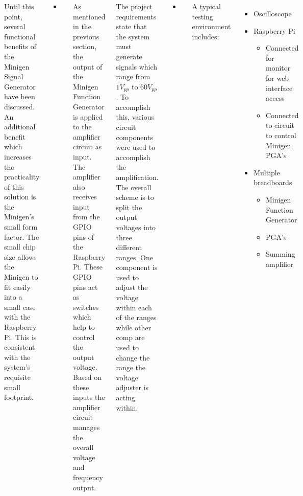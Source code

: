 \documentclass[25pt, a0paper, portrait, margin=0mm, innermargin=15mm, blockverticalspace=15mm, colspace=15mm, subcolspace=8mm]{tikzposter}
\begin{document}
\begin{columns}
{Until this point,
several functional benefits of the Minigen Signal Generator have been discussed.
An additional benefit which 
increases the practicality of this solution is the Minigen's small form factor.
The small chip size 
allows the Minigen to fit easily into a small case 
with the Raspberry Pi.
This is consistent with the system's requisite small footprint.

\begin{itemize}
\item 
\end{itemize}
}

{
As mentioned in the previous section,
the output of the Minigen Function Generator
is applied to the amplifier circuit as input.
The amplifier also receives input from 
the GPIO pins of the Raspberry Pi.
These GPIO pins act as switches which help to control the output voltage.
Based on these inputs 
the amplifier circuit manages the overall 
voltage and frequency output.

The project requirements state that the system must 
generate signals which range from $1V_{pp}$ to $60V_{pp}$. 
To accomplish this,
various circuit components were used to accomplish the amplification.
The overall scheme is to split the output voltages into
three different ranges.
One component is used to adjust the voltage within each of the ranges while
other comp are used to change the range the voltage adjuster is acting within.

\begin{itemize}
\item 
\end{itemize}
}

%
%
{
A typical testing environment includes:
\begin{itemize}
\item Oscilloscope
\item Raspberry Pi
  \begin{itemize}
  \item Connected for monitor for web interface access
  \item Connected to circuit to control Minigen, PGA's
  \end{itemize}
\item Multiple breadboards
  \begin{itemize}
  \item Minigen Function Generator
  \item PGA's
  \item Summing amplifier
  \end{itemize}
\end{itemize}

}
\end{columns}
\end{document}
